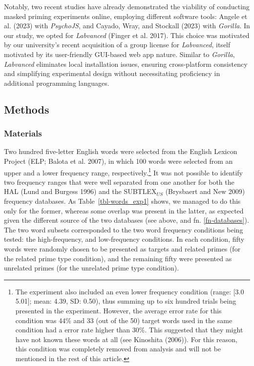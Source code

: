 \documentclass[
]{interact}
\begin{document}
Notably, two recent studies have already demonstrated the viability of
conducting masked priming experiments online, employing different
software tools: Angele et al. (2023) with \emph{PsychoJS}, and Cayado,
Wray, and Stockall (2023) with \emph{Gorilla}. In our study, we opted
for \emph{Labvanced} (Finger et al. 2017). This choice was motivated by
our university's recent acquisition of a group license for
\emph{Labvanced}, itself motivated by its user-friendly GUI-based web
app nature. Similar to \emph{Gorilla}, \emph{Labvanced} eliminates local
installation issues, ensuring cross-platform consistency and simplifying
experimental design without necessitating proficiency in additional
programming languages.

\subsection{Methods}\label{sec-exp1-methods}

\subsubsection{Materials}\label{sec-exp1-methods-materials}

Two hundred five-letter English words were selected from the English
Lexicon Project (ELP; Balota et al. 2007), in which 100 words were
selected from an upper and a lower frequency range,
respectively.\footnote{The experiment also included an even lower
  frequency condition (range: {[}3.0 5.01{]}; mean: 4.39, SD: 0.50),
  thus summing up to six hundred trials being presented in the
  experiment. However, the average error rate for this condition was
  44\% and 33 (out of the 50) target words used in the same condition
  had a error rate higher than 30\%. This suggested that they might have
  not known these words at all (see Kinoshita (2006)). For this reason,
  this condition was completely removed from analysis and will not be
  mentioned in the rest of this article.} It was not possible to
identify two frequency ranges that were well separated from one another
for both the HAL (Lund and Burgess 1996) and the SUBTLEX\(_{US}\)
(Brysbaert and New 2009) frequency databases. As
Table~\ref{tbl-words_exp1} shows, we managed to do this only for the
former, whereas some overlap was present in the latter, as expected
given the different source of the two databases (see above, and fn.
\ref{fn-databases}). The two word subsets corresponded to the two word
frequency conditions being tested: the high-frequency, and low-frequency
conditions. In each condition, fifty words were randomly chosen to be
presented as targets and related primes (for the related prime type
condition), and the remaining fifty were presented as unrelated primes
(for the unrelated prime type condition).
\end{document}
